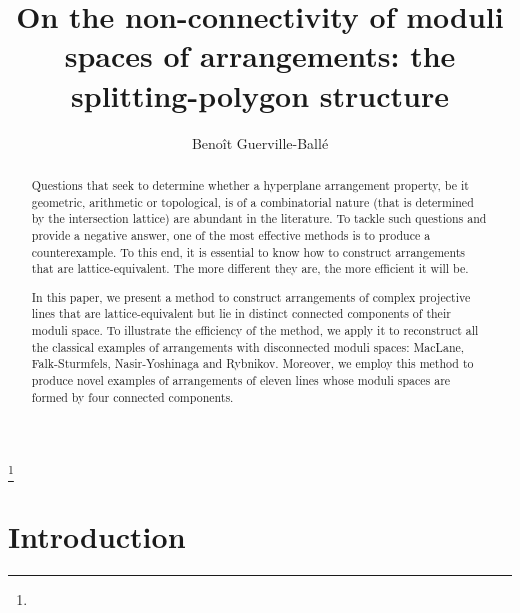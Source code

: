 \documentclass[11pt, a4paper]{amsart}
\theoremstyle{definition}
\theoremstyle{remark}
\begin{document}
\title[On the non-connectivity of moduli spaces of arrangements]{On the non-connectivity of moduli spaces of arrangements: the splitting-polygon structure}

\author[B. Guerville-Ball\'e]{Beno\^it Guerville-Ball\'e}
\address{
	Institute of Mathematics for Industry, Kyushu University \\
	Motooka 744, Nishi-ku, Fukuoka 819-0395, Japan}

\thanks{}				%



\begin{abstract}
	Questions that seek to determine whether a hyperplane arrangement property, be it geometric, arithmetic or topological, is of a combinatorial nature (that is determined by the intersection lattice) are abundant in the literature. To tackle such questions and provide a negative answer, one of the most effective methods is to produce a counterexample. To this end, it is essential to know how to construct arrangements that are lattice-equivalent. The more different they are, the more efficient it will be.
		
	In this paper, we present a method to construct arrangements of complex projective lines that are lattice-equivalent but lie in distinct connected components of their moduli space. To illustrate the efficiency of the method, we apply it to reconstruct all the classical examples of arrangements with disconnected moduli spaces: MacLane, Falk-Sturmfels, Nasir-Yoshinaga and Rybnikov. Moreover, we employ this method to produce novel examples of arrangements of eleven lines whose moduli spaces are formed by four connected components.
\end{abstract}


\maketitle


\section*{Introduction}
\end{document}
